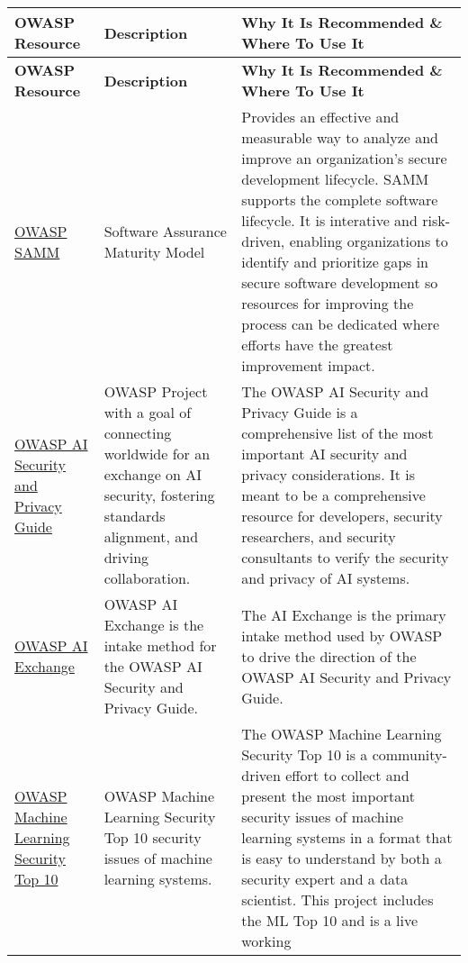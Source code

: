 \setlength\LTleft{0pt}
\setlength\LTright{0pt}
\begin{longtable}[c]{|p{}|p{}|p{}|}
  \hline
  \rowcolor{owasplightpurple}
  \textbf{OWASP Resource} &
  \textbf{Description} &
  \textbf{Why It Is Recommended \& Where To Use It} \\
  \hline
  \endfirsthead
  \hline
  \rowcolor{owasplightpurple}
  \textbf{OWASP Resource} &
  \textbf{Description} &
  \textbf{Why It Is Recommended \& Where To Use It} \\
  \hline
  \endhead
  \endfoot
  \href{https://owasp.org/www-project-samm/}{OWASP SAMM}&
  Software Assurance Maturity Model &
  Provides an effective and measurable way to analyze and improve an
  organization's secure development lifecycle. SAMM supports the complete
  software lifecycle. It is interative and risk-driven, enabling organizations
  to identify and prioritize gaps in secure software development so resources
  for improving the process can be dedicated where efforts have the greatest
  improvement impact. \\
  \hline
  \href{https://owasp.org/www-project-ai-security-and-privacy-guide/}{OWASP AI Security and Privacy Guide} &
  OWASP Project with a goal of connecting worldwide for an exchange on AI
  security, fostering standards alignment, and driving collaboration. &
  The OWASP AI Security and Privacy Guide is a comprehensive list of the most
  important AI security and privacy considerations. It is meant to be a
  comprehensive resource for developers, security researchers, and security
  consultants to verify the security and privacy of AI systems. \\
  \hline
  \href{https://owasp.org/www-project-ai-security/}{OWASP AI Exchange} &
  OWASP AI Exchange is the intake method for the OWASP AI Security and Privacy Guide. &
  The AI Exchange is the primary intake method used by OWASP to drive the direction of
  the OWASP AI Security and Privacy Guide. \\
  \hline
  \href{https://mltop10.info/}{OWASP Machine Learning Security Top 10} &
  OWASP Machine Learning Security Top 10 security issues of machine learning systems. &
  The OWASP Machine Learning Security Top 10 is a community-driven effort to
  collect and present the most important security issues of machine learning
  systems in a format that is easy to understand by both a security expert and
  a data scientist. This project includes the ML Top 10 and is a live working

\end{longtable}
